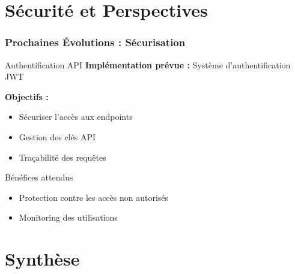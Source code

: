 \documentclass[
	11pt,
	aspectratio=169,
]{beamer}
\begin{document}

\section{Sécurité et Perspectives}

\begin{frame}
	\frametitle{Prochaines Évolutions : Sécurisation}
	
	\begin{block}{Authentification API}
		\textbf{Implémentation prévue :} Système d'authentification JWT
		
		\bigskip
		
		\textbf{Objectifs :}
		\begin{itemize}
			\item Sécuriser l'accès aux endpoints
			\item Gestion des clés API
			\item Traçabilité des requêtes
		\end{itemize}
	\end{block}
	
	\smallskip
	
	\begin{exampleblock}{Bénéfices attendus}
		\begin{itemize}
			\item Protection contre les accès non autorisés
			\item Monitoring des utilisations
		\end{itemize}
	\end{exampleblock}
\end{frame}


\section{Synthèse}
\end{document}
